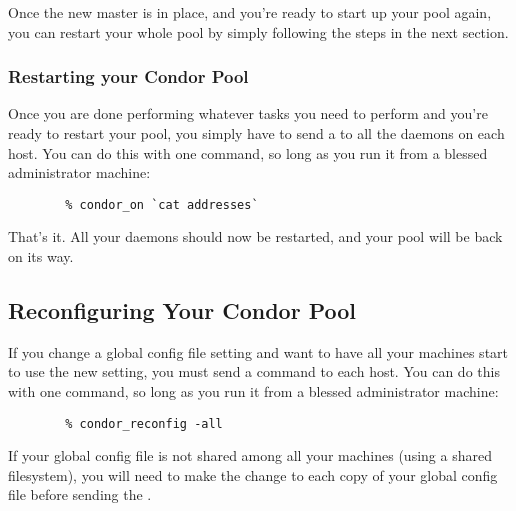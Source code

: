 Once the new master is in place, and you're ready to start up your
pool again, you can restart your whole pool by simply following the
steps in the next section.

\subsubsection{\label{sec:Pool-Restart}Restarting your Condor Pool}

Once you are done performing whatever tasks you need to perform and
you're ready to restart your pool, you simply have to send a
 to all the  daemons on each host.
You can do this with one command, so long as you run it from a blessed
administrator machine:
\begin{verbatim}
        % condor_on `cat addresses`
\end{verbatim}
That's it.  All your daemons should now be restarted, and your pool
will be back on its way.

\subsection{\label{sec:Reconfigure-Pool}Reconfiguring Your Condor Pool}

If you change a global config file setting and want to have all your
machines start to use the new setting, you must send a
 command to each host.
You can do this with one command, so long as you run it from a blessed
administrator machine:
\begin{verbatim}
        % condor_reconfig -all
\end{verbatim}

\Note If your global config file is not shared among all your machines
(using a shared filesystem), you will need to make the change to each
copy of your global config file before sending the .
